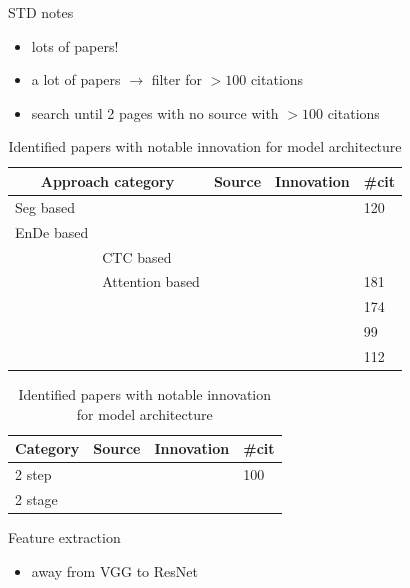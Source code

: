 STD notes
\begin{itemize}
    \item lots of papers!
    \item a lot of papers $\rightarrow$ filter for $>100$ citations
    \item search until 2 pages with no source with $>100$ citations
\end{itemize}

\begin{table}[h]
    \centering\scriptsize
    \begin{tabular}{p{}p{}p{}
            p{}p{}}
        \multicolumn{2}{c}{Approach category} & Source & Innovation & \#cit \\
        \toprule
        Seg based & &~\cite{liao_scene_2018} & & 120 \\
        \midrule
        \ac{EnDe} based & & \\
            & CTC based & \\
            & Attention based &~\cite{zhan_esir_2019} & & 181 \\
            & &~\cite{luo_multi-object_2019} & & 174 \\
            & &~\cite{bai_edit_2018} & & 99 \\
            & &~\cite{liu_char-net_2018} & & 112 \\
        \bottomrule
    \end{tabular}
    \caption{%
        Identified papers with notable innovation for model architecture\label{tb:steps-properties}
    }
\end{table}

\begin{table}[h]
    \centering\scriptsize
    \begin{tabular}{p{}p{}p{}p{}}
        Category & Source & Innovation & \#cit\\
        \toprule
        2 step &~\cite{liu_abcnet_2020} & & 100 \\
        2 stage & \\
        \bottomrule
    \end{tabular}
    \caption{%
        Identified papers with notable innovation for model architecture\label{tb:steps-properties}
    }
\end{table}

Feature extraction
\begin{itemize}
    \item away from VGG to ResNet
\end{itemize}
